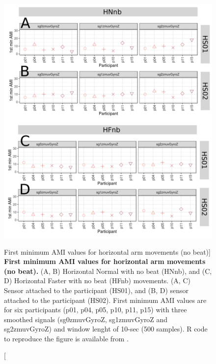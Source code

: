 \begin{figure}
\centering
\includegraphics[width=1.0\textwidth]{ami_Hnb_w10}
	\caption
	[First minimum AMI values for horizontal arm movements (no beat)]{
	{\bf First minimum AMI values for horizontal arm movements (no beat).}
		(A, B) Horizontal Normal with no beat (HNnb), and 
		(C, D) Horizontal Faster with no beat (HFnb) movements.
		(A, C) Sensor attached to the participant (HS01), and
		(B, D) sensor attached to the participant (HS02).
		First minimum AMI values are for six participants 
		(p01, p04, p05, p10, p11, p15) with three smoothed 
		signals (sg0zmuvGyroZ, sg1zmuvGyroZ and sg2zmuvGyroZ) and 
		window lenght of 10-sec (500 samples).
		R code to reproduce the figure is available 
		from \cite{hwum2018}.
        }
    \label{fig:amiHnb}
\end{figure}
